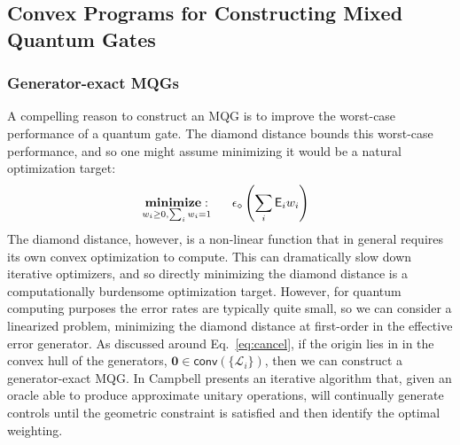 \documentclass[aps,nofootinbib,pra,notitlepage,twocolumn]{revtex4-1}
\newcommand{\error}{\ensuremath{{\mathsf{E}}}}
\newcommand{\genmat}{\ensuremath{{\mathcal{L}}}}
\newcommand{\dnorm}{\ensuremath{\epsilon_\diamond}}
\newcommand{\0}{\ensuremath{\mathbf{0}}}
\newcommand{\weight}{\ensuremath{w}}
\begin{document}

\subsection{Convex Programs for Constructing Mixed Quantum Gates}
\subsubsection{Generator-exact MQGs} %
\label{sub:first_order_generators}
\noindent A compelling reason to construct an MQG is to improve the worst-case performance of a quantum gate. The diamond distance bounds this worst-case performance, and so one might assume minimizing it would be a natural optimization target:
\begin{equation}\label{eq:ddmin}
  \begin{split}
    &\underset{\weight_i\geq0, \sum_i\weight_i=1}{\textbf{minimize}: } \hspace{.5cm} \dnorm\left(\sum_i\error_i \weight_i\right)
  \end{split}
\end{equation}
The diamond distance, however, is a non-linear function that in general requires its own convex optimization to compute\cite{watrous2018theory}. This can dramatically slow down iterative optimizers, and so directly minimizing the diamond distance is a computationally burdensome optimization target. However, for quantum computing purposes the error rates are typically quite small, so we can consider a linearized problem, minimizing the diamond distance at first-order in the effective error generator. As discussed around Eq.~\eqref{eq:cancel}, if the origin lies in in the convex hull of the generators, $\0 \in \mathsf{conv}(\{\genmat_i\})$, then we can construct a generator-exact MQG. In \cite{Campbell2017} Campbell presents an iterative algorithm that, given an oracle able to produce approximate unitary operations, will continually generate controls until the geometric constraint is satisfied and then identify the optimal weighting. 
\end{document}
